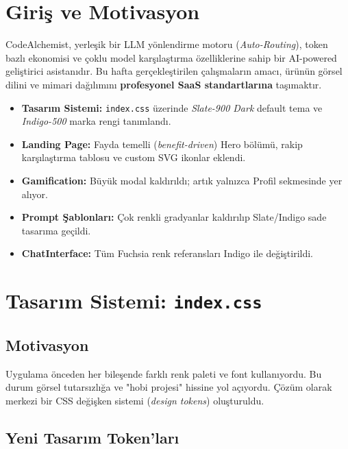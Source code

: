 \documentclass[12pt,a4paper]{article}
\begin{document}
\section{Giriş ve Motivasyon}

CodeAlchemist, yerleşik bir LLM yönlendirme motoru (\textit{Auto-Routing}), token bazlı ekonomisi ve çoklu model karşılaştırma özelliklerine sahip bir AI-powered geliştirici asistanıdır. Bu hafta gerçekleştirilen çalışmaların amacı, ürünün görsel dilini ve mimari dağılımını \textbf{profesyonel SaaS standartlarına} taşımaktır.

\begin{changesummary}
\begin{itemize}[noitemsep]
  \item \textbf{Tasarım Sistemi:} \texttt{index.css} üzerinde \textit{Slate-900 Dark} default tema ve \textit{Indigo-500} marka rengi tanımlandı.
  \item \textbf{Landing Page:} Fayda temelli (\textit{benefit-driven}) Hero bölümü, rakip karşılaştırma tablosu ve custom SVG ikonlar eklendi.
  \item \textbf{Gamification:} Büyük modal kaldırıldı; artık yalnızca Profil sekmesinde yer alıyor.
  \item \textbf{Prompt Şablonları:} Çok renkli gradyanlar kaldırılıp Slate/Indigo sade tasarıma geçildi.
  \item \textbf{ChatInterface:} Tüm Fuchsia renk referansları Indigo ile değiştirildi.
\end{itemize}
\end{changesummary}

\section{Tasarım Sistemi: \texttt{index.css}}

\subsection{Motivasyon}

Uygulama önceden her bileşende farklı renk paleti ve font kullanıyordu. Bu durum görsel tutarsızlığa ve "hobi projesi" hissine yol açıyordu. Çözüm olarak merkezi bir CSS değişken sistemi (\textit{design tokens}) oluşturuldu.

\subsection{Yeni Tasarım Token'ları}
\end{document}
